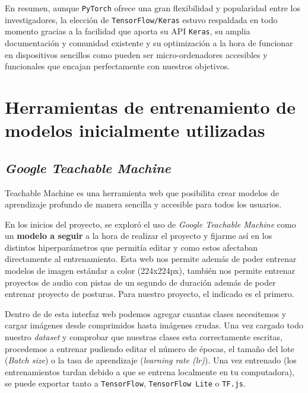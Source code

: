 En resumen, aunque \texttt{PyTorch} ofrece una gran flexibilidad y popularidad entre los investigadores, la elección de \texttt{TensorFlow/Keras} estuvo respaldada en todo momento gracias a la facilidad que aporta su API \texttt{Keras}, su amplia documentación y comunidad existente y su optimización a la hora de funcionar en dispositivos sencillos como pueden ser micro-ordenadores accesibles y funcionales que encajan perfectamente con nuestros objetivos.

\section{Herramientas de entrenamiento de modelos inicialmente utilizadas}\label{herramientas-de-entrenamiento-de-modelos utilizada}

\subsection{\textit{Google Teachable Machine}}\label{google-teachable-machine}


Teachable Machine es una herramienta web que posibilita crear modelos de aprendizaje profundo de manera sencilla y accesible para todos los usuarios\cite{web:teachable_machine}.

En los inicios del proyecto, se exploró el uso de \textit{Google Teachable Machine} como un \textbf{modelo a seguir} a la hora de realizar el proyecto y fijarme así en los distintos hiperparámetros que permitía editar y como estos afectaban directamente al entrenamiento. Esta web nos permite además de poder entrenar modelos de imagen estándar a color (224x224px), también nos permite entrenar proyectos de audio con pistas de un segundo de duración además de poder entrenar proyecto de posturas. Para nuestro proyecto, el indicado es el primero.

Dentro de de esta interfaz web podemos agregar cuantas clases necesitemos y cargar imágenes desde comprimidos hasta imágenes crudas. Una vez cargado todo nuestro \textit{dataset} y comprobar que nuestras clases esta correctamente escritas, procedemos a entrenar pudiendo editar el número de épocas, el tamaño del lote (\textit{Batch size}) o la tasa de aprendizaje (\textit{learning rate (lr)}). Una vez entrenado (los entrenamientos tardan debido a que se entrena localmente en tu computadora), se puede exportar tanto a \texttt{TensorFlow}, \texttt{TensorFlow Lite} o \texttt{TF.js}.

